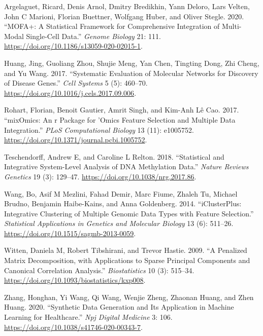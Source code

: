 \documentclass[
]{article}
\newlength{\cslhangindent}
\newenvironment{CSLReferences}[2] %
 {\begin{list}{}{%
  \setlength{\itemindent}{0pt}
  \setlength{\leftmargin}{0pt}
  \setlength{\parsep}{0pt}
  \ifodd #1
   \setlength{\leftmargin}{\cslhangindent}
   \setlength{\itemindent}{-1\cslhangindent}
  \fi
  \setlength{\itemsep}{#2\baselineskip}}}
 {\end{list}}
\begin{document}
\protect{}\label{refs}
\begin{CSLReferences}{1}{0}
Argelaguet, Ricard, Denis Arnol, Dmitry Bredikhin, Yann Deloro, Lars
Velten, John C Marioni, Florian Buettner, Wolfgang Huber, and Oliver
Stegle. 2020. {``MOFA+: A Statistical Framework for Comprehensive
Integration of Multi-Modal Single-Cell Data.''} \emph{Genome Biology}
21: 111. \url{https://doi.org/10.1186/s13059-020-02015-1}.

Huang, Jing, Guoliang Zhou, Shujie Meng, Yan Chen, Tingting Dong, Zhi
Cheng, and Yu Wang. 2017. {``Systematic Evaluation of Molecular Networks
for Discovery of Disease Genes.''} \emph{Cell Systems} 5 (5): 460--70.
\url{https://doi.org/10.1016/j.cels.2017.09.006}.

Rohart, Florian, Benoit Gautier, Amrit Singh, and Kim-Anh Lê Cao. 2017.
{``mixOmics: An r Package for 'Omics Feature Selection and Multiple Data
Integration.''} \emph{PLoS Computational Biology} 13 (11): e1005752.
\url{https://doi.org/10.1371/journal.pcbi.1005752}.

Teschendorff, Andrew E, and Caroline L Relton. 2018. {``Statistical and
Integrative System-Level Analysis of DNA Methylation Data.''}
\emph{Nature Reviews Genetics} 19 (3): 129--47.
\url{https://doi.org/10.1038/nrg.2017.86}.

Wang, Bo, Asif M Mezlini, Fahad Demir, Marc Fiume, Zhaleh Tu, Michael
Brudno, Benjamin Haibe-Kains, and Anna Goldenberg. 2014.
{``iClusterPlus: Integrative Clustering of Multiple Genomic Data Types
with Feature Selection.''} \emph{Statistical Applications in Genetics
and Molecular Biology} 13 (6): 511--26.
\url{https://doi.org/10.1515/sagmb-2013-0059}.

Witten, Daniela M, Robert Tibshirani, and Trevor Hastie. 2009. {``A
Penalized Matrix Decomposition, with Applications to Sparse Principal
Components and Canonical Correlation Analysis.''} \emph{Biostatistics}
10 (3): 515--34. \url{https://doi.org/10.1093/biostatistics/kxp008}.

Zhang, Honghan, Yi Wang, Qi Wang, Wenjie Zheng, Zhaonan Huang, and Zhen
Huang. 2020. {``Synthetic Data Generation and Its Application in Machine
Learning for Healthcare.''} \emph{Npj Digital Medicine} 3: 106.
\url{https://doi.org/10.1038/s41746-020-00343-7}.

\end{CSLReferences}
\end{document}
